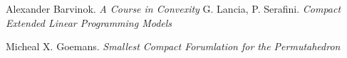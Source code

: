 \documentclass{article}
\theoremstyle{plain}
\theoremstyle{definition}
\begin{document}
\begin{thebibliography}{000}
    Alexander Barvinok. \emph{A Course in Convexity} 
    G. Lancia, P. Serafini. \emph{Compact Extended Linear Programming Models}
    
    Micheal X. Goemans. \emph{Smallest Compact Forumlation for the Permutahedron}
\end{thebibliography}    
\end{document}
